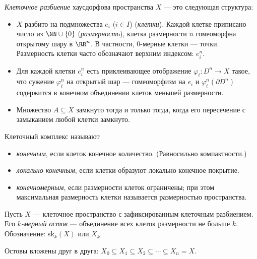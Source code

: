 \documentclass[12pt,a4paper]{article}
\newcommand{\sk}{\mathrm{sk}}
\begin{document}
    \begin{definition}[другое]
        \emph{Клеточное разбиение} хаусдорфова пространства $X$ --- это следующая структура:
        \begin{itemize}
            \item $X$ разбито на подмножества $e_i$ ($i \in I$) (\emph{клетки}). Каждой клетке приписано число из $\NN \cup \{0\}$ (\emph{размерность}), клетка размерности $n$ гомеоморфна открытому шару в $\RR^n$. В частности, 0-мерные клетки --- точки. Размерность клетки часто обозначают верхним индексом: $e^n_i$.
            \item Для каждой клетки $e^n_i$ есть приклеивающее отображение $\varphi_i: D^n \to X$ такое, что сужение $\varphi_i^n$ на открытый шар --- гомеоморфизм на $e_i$ и $\varphi_i^n(\partial D^n)$ содержится в конечном объединении клеток меньшей размерности.
            \item Множество $A \subseteq X$ замкнуто тогда и только тогда, когда его пересечение с замыканием любой клетки замкнуто.
        \end{itemize}
    \end{definition}

    \begin{definition}
        Клеточный комплекс называют
        \begin{itemize}
            \item \emph{конечным}, если клеток конечное количество. (Равносильно компактности.)
            \item \emph{локально конечным}, если клетки образуют локально конечное покрытие.
            \item \emph{конечномерным}, если размерности клеток ограничены; при этом максимальная размерность клетки называется размерностью пространства.
        \end{itemize}
    \end{definition}

    \begin{definition}
        Пусть $X$ --- клеточное пространство с зафиксированным клеточным разбиением. Его \emph{$k$-мерный остов} --- объединение всех клеток размерности не больше $k$. Обозначение: $\sk_k(X)$ или $X_k$.
    \end{definition}

    \begin{remark*}
        Остовы вложены друг в друга: $X_0 \subseteq X_1 \subseteq X_2 \subseteq \cdots \subseteq X_n = X$.
    \end{remark*}
\end{document}
